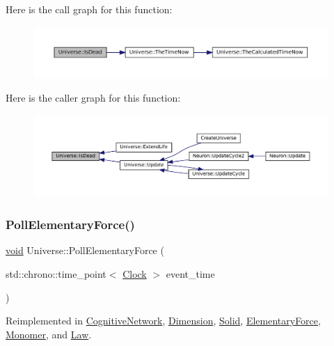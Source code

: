 Here is the call graph for this function\+:\nopagebreak
\begin{figure}[H]
\begin{center}
\leavevmode
\includegraphics[width=350pt]{class_universe_a8fdaa6d06584e1ef50c4c613b22b786e_cgraph}
\end{center}
\end{figure}
Here is the caller graph for this function\+:\nopagebreak
\begin{figure}[H]
\begin{center}
\leavevmode
\includegraphics[width=350pt]{class_universe_a8fdaa6d06584e1ef50c4c613b22b786e_icgraph}
\end{center}
\end{figure}
\mbox{\label{class_universe_a0c485c504542409cbb5cfd8543c35b11}} 
\subsubsection{\texorpdfstring{Poll\+Elementary\+Force()}{PollElementaryForce()}}
{\footnotesize\ttfamily \mbox{\hyperlink{glad_8h_a950fc91edb4504f62f1c577bf4727c29}{void}} Universe\+::\+Poll\+Elementary\+Force (\begin{DoxyParamCaption}\item[{std\+::chrono\+::time\+\_\+point$<$ \mbox{\hyperlink{universe_8h_a0ef8d951d1ca5ab3cfaf7ab4c7a6fd80}{Clock}} $>$}]{event\+\_\+time }\end{DoxyParamCaption})\hspace{0.3cm}{\ttfamily [virtual]}}



Reimplemented in \mbox{\hyperlink{class_cognitive_network_ac97c08a0af7dc0d02fbe059827b6be87}{Cognitive\+Network}}, \mbox{\hyperlink{class_dimension_a5b07f5c8558233c8f3488baf1fe3459a}{Dimension}}, \mbox{\hyperlink{class_solid_ae2a486e59f11f96a1a39756b3f3da53f}{Solid}}, \mbox{\hyperlink{class_elementary_force_aa5ab479744dbf3e8578f8d2974299ff7}{Elementary\+Force}}, \mbox{\hyperlink{class_monomer_a5b2375df1e19abdf6045c475d2ac23ca}{Monomer}}, and \mbox{\hyperlink{class_law_af99520c95b2cd8af0af110b78b2288ef}{Law}}.



